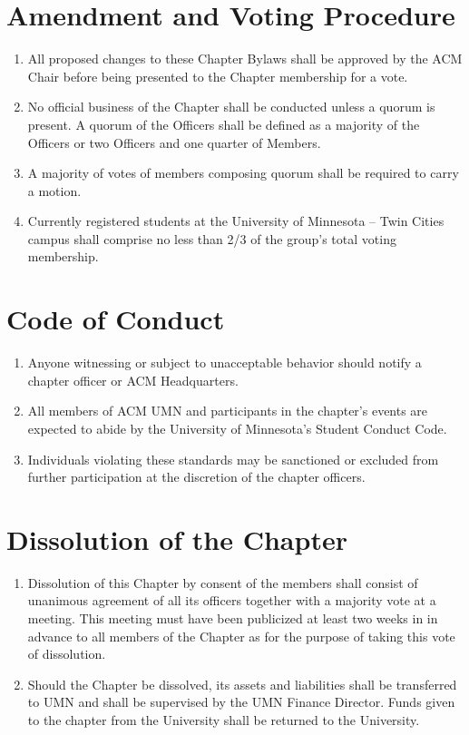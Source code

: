 \section{Amendment and Voting Procedure}
\begin{enumerate}
	\item All proposed changes to these Chapter Bylaws shall be approved by the ACM Chair before being presented to the Chapter membership for a vote.
	\item No official business of the Chapter shall be conducted unless a quorum is present. A quorum of the Officers shall be defined as a majority of the Officers or two Officers and one quarter of Members.
	\item A majority of votes of members composing quorum shall be required to carry a motion.
	\item Currently registered students at the University of Minnesota – Twin Cities campus shall comprise no less than 2/3 of the group's total voting membership. 
\end{enumerate}

\section{Code of Conduct}
\begin{enumerate}
	\item Anyone witnessing or subject to unacceptable behavior should notify a chapter officer or ACM Headquarters.
	\item All members of ACM UMN and participants in the chapter’s events are expected to abide by the University of Minnesota’s Student Conduct Code.
	\item Individuals violating these standards may be sanctioned or excluded from further participation at the discretion of the chapter officers.
\end{enumerate}

\section{Dissolution of the Chapter}
\begin{enumerate}
	\item Dissolution of this Chapter by consent of the members shall consist of unanimous agreement of all its officers together with a majority vote at a meeting. This meeting must have been publicized at least two weeks in in advance to all members of the Chapter as for the purpose of taking this vote of dissolution.
	\item Should the Chapter be dissolved, its assets and liabilities shall be transferred to UMN and shall be supervised by the UMN Finance Director.  Funds given to the chapter from the University shall be returned to the University.
\end{enumerate}


